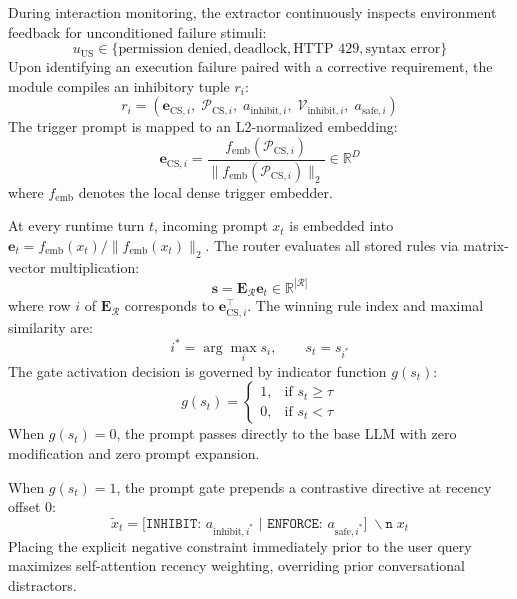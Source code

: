 \documentclass[10pt,conference]{IEEEtran}
\begin{document}
During interaction monitoring, the extractor continuously inspects environment feedback for unconditioned failure stimuli:
\begin{equation}
    u_{\text{US}} \in \{\text{permission denied}, \text{deadlock}, \text{HTTP 429}, \text{syntax error}\}
\end{equation}
Upon identifying an execution failure paired with a corrective requirement, the module compiles an inhibitory tuple $r_i$:
\begin{equation}
    r_i = \left(\mathbf{e}_{\text{CS}, i},\; \mathcal{P}_{\text{CS}, i},\; a_{\text{inhibit}, i},\; \mathcal{V}_{\text{inhibit}, i},\; a_{\text{safe}, i}\right)
\end{equation}
The trigger prompt is mapped to an L2-normalized embedding:
\begin{equation}
    \mathbf{e}_{\text{CS}, i} = \frac{f_{\text{emb}}(\mathcal{P}_{\text{CS}, i})}{\|f_{\text{emb}}(\mathcal{P}_{\text{CS}, i})\|_2} \in \mathbb{R}^D
\end{equation}
where $f_{\text{emb}}$ denotes the local dense trigger embedder.

At every runtime turn $t$, incoming prompt $x_t$ is embedded into $\mathbf{e}_t = f_{\text{emb}}(x_t) / \|f_{\text{emb}}(x_t)\|_2$. The router evaluates all stored rules via matrix-vector multiplication:
\begin{equation}
    \mathbf{s} = \mathbf{E}_{\mathcal{R}} \mathbf{e}_t \in \mathbb{R}^{|\mathcal{R}|}
\end{equation}
where row $i$ of $\mathbf{E}_{\mathcal{R}}$ corresponds to $\mathbf{e}_{\text{CS}, i}^\top$. The winning rule index and maximal similarity are:
\begin{equation}
    i^* = \arg\max_{i} s_i, \qquad s_t = s_{i^*}
\end{equation}
The gate activation decision is governed by indicator function $g(s_t)$:
\begin{equation}
    g(s_t) = \begin{cases}
        1, & \text{if } s_t \ge \tau \\
        0, & \text{if } s_t < \tau
    \end{cases}
\end{equation}
When $g(s_t) = 0$, the prompt passes directly to the base LLM with zero modification and zero prompt expansion.

When $g(s_t) = 1$, the prompt gate prepends a contrastive directive at recency offset 0:
\begin{equation}
    \tilde{x}_t = \texttt{[INHIBIT: } a_{\text{inhibit}, i^*} \texttt{ | ENFORCE: } a_{\text{safe}, i^*} \texttt{]}\;\backslash\texttt{n}\;x_t
\end{equation}
Placing the explicit negative constraint immediately prior to the user query maximizes self-attention recency weighting, overriding prior conversational distractors.
\end{document}
